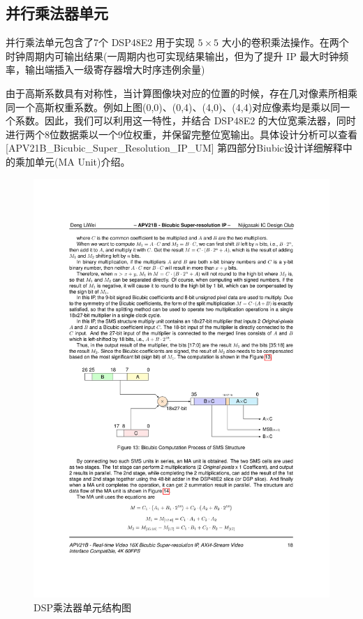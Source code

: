 \documentclass[12pt, a4paper, oneside]{ctexbook}
\begin{document}
	\subsection{并行乘法器单元}
	并行乘法单元包含了7个 DSP48E2 用于实现 $5\times5$ 大小的卷积乘法操作。在两个时钟周期内可输出结果(一周期内也可实现结果输出，但为了提升 IP 最大时钟频率，输出端插入一级寄存器增大时序违例余量)\par 由于高斯系数具有对称性，当计算图像块对应的位置的时候，存在几对像素所相乘同一个高斯权重系数。例如上图(0,0)、(0,4)、(4,0)、(4,4)对应像素均是乘以同一个系数。因此，我们可以利用这一特性，并结合 DSP48E2 的大位宽乘法器，同时进行两个8位数据乘以一个9位权重，并保留完整位宽输出。具体设计分析可以查看[APV21B\_Bicubic\_Super\_Resolution\_IP\_UM] 第四部分Biubic设计详细解释中的乘加单元(MA Unit)介绍。%
		\begin{figure}[h]
			\centering
			\includegraphics[scale=1]{pic/mul_unit}
			\caption{DSP乘法器单元结构图}
			\label{fig:mulunit}
		\end{figure}
\end{document}
